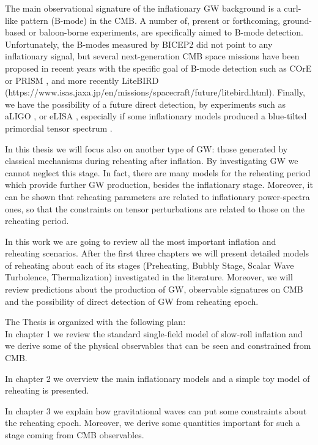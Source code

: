 \documentclass[11pt,a4paper,twoside]{book}
\begin{document}
The main observational signature of the inflationary GW background is a curl-like pattern (B-mode) in the CMB. A number of, present or forthcoming, ground-based or baloon-borne experiments, are specifically aimed to B-mode detection. Unfortunately, the B-modes measured by BICEP2 \cite{Bicep2BMode:Intro} did not point to any inflationary signal, but several next-generation CMB space missions have been proposed in recent years with the specific goal of B-mode detection such as COrE \cite{COre:intro} or PRISM \cite{PRISM:intro}, and more recently LiteBIRD (https://www.isas.jaxa.jp/en/missions/spacecraft/future/litebird.html). 
Finally, we have the possibility of a future direct detection, by experiments such as aLIGO \cite{LIGO:intro}, or eLISA \cite{Lisa:Intro}, especially if some inflationary models produced a blue-tilted primordial tensor spectrum \cite{GWFromInflation:Intro}.

In this thesis we will focus also on another type of GW: those generated by classical mechanisms during reheating after inflation. By investigating  GW we cannot neglect this stage. In fact, there are many models for the reheating period which provide further GW production, besides the inflationary stage. Moreover, it can be shown that reheating parameters are related to inflationary power-spectra ones, so that the constraints on tensor perturbations are related to those on the reheating period.


In this work we are going to review all the most important inflation and reheating scenarios. After the first three chapters we will present detailed models of reheating about each of its stages (Preheating, Bubbly Stage, Scalar Wave Turbolence, Thermalization) investigated in the literature. Moreover, we will review predictions about the production of GW, observable signatures on CMB and the possibility of direct detection of GW from reheating epoch.

The Thesis is organized with the following plan:\\
In  chapter 1 we review the standard single-field model of slow-roll inflation and we derive some of the physical observables that can be seen and constrained from CMB. 

In chapter 2 we overview the main inflationary models and a simple toy model of reheating is presented.

 In chapter 3 we explain  how gravitational waves can put some constraints about the reheating epoch. Moreover, we derive some quantities important for such  a stage coming from CMB observables.
 
\end{document}
